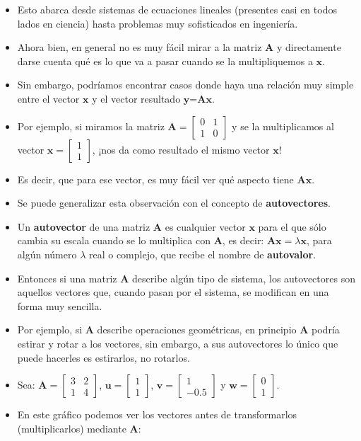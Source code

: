 \documentclass[openany]{book}
\begin{document}
\begin{itemize}
\item
  Esto abarca desde sistemas de ecuaciones lineales (presentes casi en todos lados en ciencia) hasta problemas muy sofisticados en ingeniería.
\item
  Ahora bien, en general no es muy fácil mirar a la matriz \(\textbf{A}\) y directamente darse cuenta qué es lo que va a pasar cuando se la multipliquemos a \(\textbf{x}\).
\item
  Sin embargo, podríamos encontrar casos donde haya una relación muy simple entre el vector \(\textbf{x}\) y el vector resultado \(\textbf{y=Ax}\).
\item
  Por ejemplo, si miramos la matriz \(\mathbf{A} = \begin{bmatrix} 0 & 1 \\ 1 & 0 \end{bmatrix}\) y se la multiplicamos al vector \(\textbf{x} = \begin{bmatrix} 1 \\ 1 \end{bmatrix}\), ¡nos da como resultado el mismo vector \(\textbf{x}\)!
\item
  Es decir, que para ese vector, es muy fácil ver qué aspecto tiene \(\textbf{Ax}\).
\item
  Se puede generalizar esta observación con el concepto de \textbf{autovectores}.
\item
  Un \textbf{autovector} de una matriz \(\textbf{A}\) es cualquier vector \(\textbf{x}\) para el que sólo cambia su escala cuando se lo multiplica con \(\textbf{A}\), es decir: \(\textbf{Ax} = \lambda \textbf{x}\), para algún número \(\lambda\) real o complejo, que recibe el nombre de \textbf{autovalor}.
\item
  Entonces si una matriz \(\textbf{A}\) describe algún tipo de sistema, los autovectores son aquellos vectores que, cuando pasan por el sistema, se modifican en una forma muy sencilla.
\item
  Por ejemplo, si \(\textbf{A}\) describe operaciones geométricas, en principio \(\textbf{A}\) podría estirar y rotar a los vectores, sin embargo, a sus autovectores lo único que puede hacerles es estirarlos, no rotarlos.
\item
  Sea: \(\mathbf{A} = \begin{bmatrix} 3 & 2 \\ 1 & 4 \end{bmatrix}\), \(\textbf{u} = \begin{bmatrix} 1 \\ 1 \end{bmatrix}\), \(\textbf{v} = \begin{bmatrix} 1 \\ -0.5 \end{bmatrix}\) y \(\textbf{w} = \begin{bmatrix} 0 \\ 1 \end{bmatrix}\).
\item
  En este gráfico podemos ver los vectores antes de transformarlos (multiplicarlos) mediante \(\mathbf{A}\):
\end{itemize}
\end{document}
